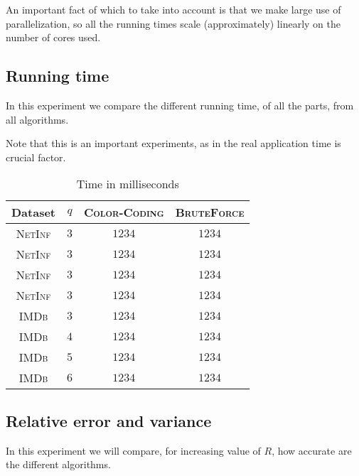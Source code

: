     An important fact of which to take into account is that we make large use of parallelization, 
    so all the running times scale (approximately) linearly on the number of cores used.
    
	\subsection*{Running time}
	
	In this experiment we compare the different running time, of all the parts, from all algorithms.
	
	Note that this is an important experiments, as in the real application time is crucial factor.\\

	\begin{table}[h]
		\centering
		\label{my-label}
		\begin{tabular}{|c|c|c|c|}
			\hline
			Dataset 		& $q$ & \textsc{Color-Coding} 	& \textsc{BruteForce} \\ \hline
			\textsc{NetInf}	& $3$ & $1234$					& $1234$ \\ \hline
			\textsc{NetInf}	& $3$ & $1234$					& $1234$ \\ \hline
			\textsc{NetInf}	& $3$ & $1234$					& $1234$ \\ \hline
			\textsc{NetInf}	& $3$ & $1234$					& $1234$ \\ \hline
			\textsc{IMDb}	& $3$ & $1234$					& $1234$ \\ \hline
			\textsc{IMDb}	& $4$ & $1234$					& $1234$ \\ \hline
			\textsc{IMDb}	& $5$ & $1234$					& $1234$ \\ \hline
			\textsc{IMDb}	& $6$ & $1234$					& $1234$ \\ \hline
		\end{tabular}
		\caption{Time in milliseconds}
	\end{table}
	
	\subsection*{Relative error and variance}
	
	In this experiment we will compare, for increasing value of $R$, how accurate are the different algorithms.\\
		
